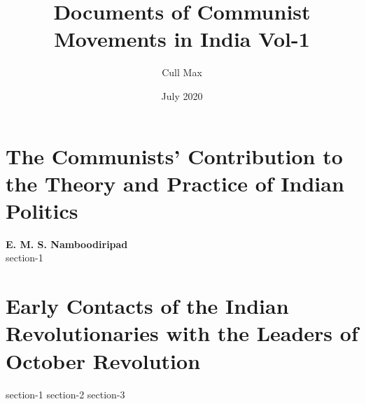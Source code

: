 \documentclass[oneside]{book}
\title{Documents of Communist Movements in India Vol-1}
\author{Cull Max}
\date{July 2020}
\begin{document}
\maketitle
\tableofcontents

\chapter{The Communists’ Contribution to the Theory and Practice of Indian Politics}
\textbf{E. M. S. Namboodiripad}\\
{section-1}

\chapter{Early Contacts of the Indian Revolutionaries with the Leaders of October Revolution}
{section-1}
{section-2}
{section-3}
\end{document}
